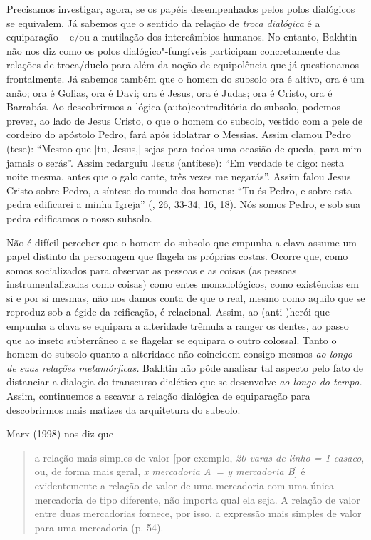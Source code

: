 {Precisamos investigar, agora, se os papéis desempenhados pelos polos
dialógicos se equivalem. Já sabemos que o sentido da relação de
\emph{troca dialógica} é a equiparação -- e/ou a mutilação dos
intercâmbios humanos. No entanto, Bakhtin não nos diz como os polos
dialógico"-fungíveis participam concretamente das relações de troca/duelo
para além da noção de equipolência que já questionamos frontalmente. Já
sabemos também que o homem do subsolo ora é altivo, ora é um anão; ora é
Golias, ora é Davi; ora é Jesus, ora é Judas; ora é Cristo, ora é
Barrabás. Ao descobrirmos a lógica (auto)contraditória do subsolo,
podemos prever, ao lado de Jesus Cristo, o que o homem do subsolo,
vestido com a pele de cordeiro do apóstolo Pedro, fará após idolatrar o
Messias. Assim clamou Pedro (tese): ``Mesmo que {[}tu, Jesus,{]} sejas
para todos uma ocasião de queda, para mim jamais o serás''. Assim
redarguiu Jesus (antítese): ``Em verdade te digo: nesta noite mesma,
antes que o galo cante, três vezes me negarás''. Assim falou Jesus
Cristo sobre Pedro, a síntese do mundo dos homens: ``Tu és Pedro, e
sobre esta pedra edificarei a minha Igreja'' (, 26, 33-34; 16,
18). Nós somos Pedro, e sob sua pedra edificamos o nosso subsolo.

Não é difícil perceber que o homem do subsolo que empunha a clava assume
um papel distinto da personagem que flagela as próprias costas. Ocorre
que, como somos socializados para observar as pessoas e as coisas (as
pessoas instrumentalizadas como coisas) como entes monadológicos, como
existências em si e por si mesmas, não nos damos conta de que o real,
mesmo como aquilo que se reproduz sob a égide da reificação, é
relacional. Assim, ao (anti-)herói que empunha a clava se equipara a
alteridade trêmula a ranger os dentes, ao passo que ao inseto
subterrâneo a se flagelar se equipara o outro colossal. Tanto o homem do
subsolo quanto a alteridade não coincidem consigo mesmos \emph{ao longo
de suas relações metamórficas.} Bakhtin não pôde analisar tal aspecto
pelo fato de distanciar a dialogia do transcurso dialético que se
desenvolve \emph{ao longo do tempo.} Assim, continuemos a escavar a
relação dialógica de equiparação para descobrirmos mais matizes da
arquitetura do subsolo.

Marx (1998) nos diz que

\begin{quote}
a relação mais simples de valor {[}por exemplo, \emph{20 varas de linho
= 1 casaco}, ou, de forma mais geral, \emph{x mercadoria A~= y
mercadoria B}{]} é evidentemente a relação de valor de uma mercadoria
com uma única mercadoria de tipo diferente, não importa qual ela seja. A
relação de valor entre duas mercadorias fornece, por isso, a expressão
mais simples de valor para uma mercadoria (p. 54).
\end{quote}

}
